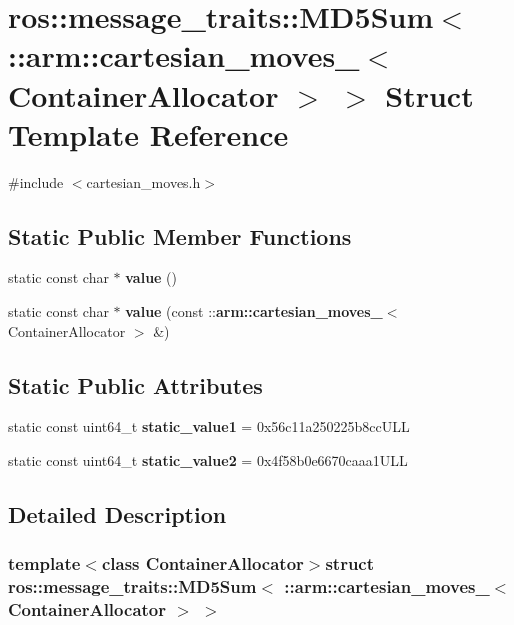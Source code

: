 \section{ros\-:\-:message\-\_\-traits\-:\-:\-M\-D5\-Sum$<$ \-:\-:arm\-:\-:cartesian\-\_\-moves\-\_\-$<$ \-Container\-Allocator $>$ $>$ \-Struct \-Template \-Reference}
\label{structros_1_1message__traits_1_1MD5Sum_3_01_1_1arm_1_1cartesian__moves___3_01ContainerAllocator_01_4_01_4}


{\ttfamily \#include $<$cartesian\-\_\-moves.\-h$>$}

\subsection*{\-Static \-Public \-Member \-Functions}
\begin{DoxyCompactItemize}
\item 
static const char $\ast$ {\bf value} ()
\item 
static const char $\ast$ {\bf value} (const \-::{\bf arm\-::cartesian\-\_\-moves\-\_\-}$<$ \-Container\-Allocator $>$ \&)
\end{DoxyCompactItemize}
\subsection*{\-Static \-Public \-Attributes}
\begin{DoxyCompactItemize}
\item 
static const uint64\-\_\-t {\bf static\-\_\-value1} = 0x56c11a250225b8cc\-U\-L\-L
\item 
static const uint64\-\_\-t {\bf static\-\_\-value2} = 0x4f58b0e6670caaa1\-U\-L\-L
\end{DoxyCompactItemize}


\subsection{\-Detailed \-Description}
\subsubsection*{template$<$class Container\-Allocator$>$struct ros\-::message\-\_\-traits\-::\-M\-D5\-Sum$<$ \-::arm\-::cartesian\-\_\-moves\-\_\-$<$ Container\-Allocator $>$ $>$}



